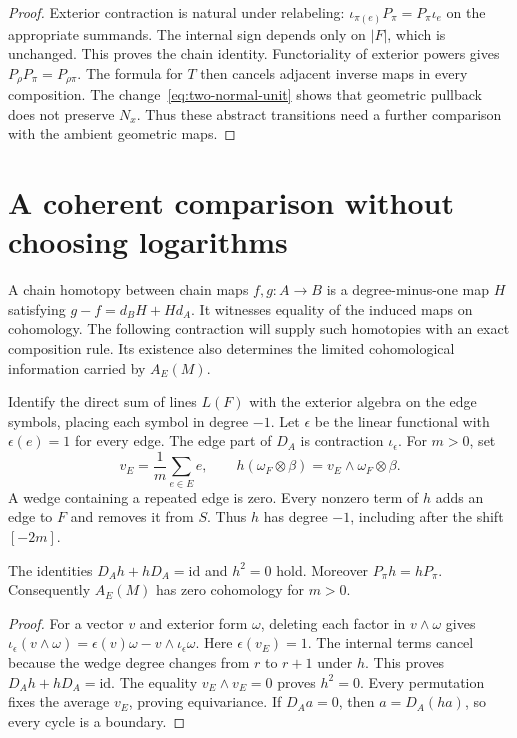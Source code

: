 \begin{proof}
Exterior contraction is natural under relabeling:
$\iota_{\pi(e)}P_\pi=P_\pi\iota_e$ on the appropriate summands.
The internal sign depends only on $|F|$, which is unchanged.
This proves the chain identity.
Functoriality of exterior powers gives $P_\rho P_\pi=P_{\rho\pi}$.
The formula for $T$ then cancels adjacent inverse maps in every composition.
The change~\eqref{eq:two-normal-unit} shows that geometric pullback does not preserve $N_x$.
Thus these abstract transitions need a further comparison with the ambient geometric maps.
\end{proof}

\section{A coherent comparison without choosing logarithms}
\label{sec:unfiltered-comparison}

A chain homotopy between chain maps $f,g:A\to B$ is a degree-minus-one map $H$ satisfying
$g-f=d_BH+Hd_A$.
It witnesses equality of the induced maps on cohomology.
The following contraction will supply such homotopies with an exact composition rule.
Its existence also determines the limited cohomological information carried by $A_E(M)$.

Identify the direct sum of lines $L(F)$ with the exterior algebra on the edge symbols,
placing each symbol in degree $-1$.
Let $\epsilon$ be the linear functional with $\epsilon(e)=1$ for every edge.
The edge part of $D_A$ is contraction $\iota_\epsilon$.
For $m>0$, set
\begin{equation}
\label{eq:average-contraction}
v_E=\frac1m\sum_{e\in E}e,\qquad
h(\omega_F\otimes\beta)=v_E\wedge\omega_F\otimes\beta.
\end{equation}
A wedge containing a repeated edge is zero.
Every nonzero term of $h$ adds an edge to $F$ and removes it from $S$.
Thus $h$ has degree $-1$, including after the shift $[-2m]$.

\begin{lemma}
\label{lem:normal-contractible}
The identities $D_Ah+hD_A=\mathrm{id}$ and $h^2=0$ hold.
Moreover $P_\pi h=hP_\pi$.
Consequently $A_E(M)$ has zero cohomology for $m>0$.
\end{lemma}

\begin{proof}
For a vector $v$ and exterior form $\omega$, deleting each factor in $v\wedge\omega$ gives
$\iota_\epsilon(v\wedge\omega)=\epsilon(v)\omega-v\wedge\iota_\epsilon\omega$.
Here $\epsilon(v_E)=1$.
The internal terms cancel because the wedge degree changes from $r$ to $r+1$ under $h$.
This proves $D_Ah+hD_A=\mathrm{id}$.
The equality $v_E\wedge v_E=0$ proves $h^2=0$.
Every permutation fixes the average $v_E$, proving equivariance.
If $D_Aa=0$, then $a=D_A(ha)$, so every cycle is a boundary.
\end{proof}

